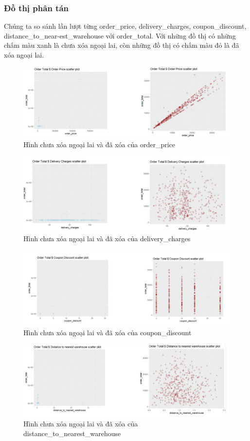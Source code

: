 \subsubsection{Đồ thị phân tán}
Chúng ta so sánh  lần lượt từng order\_price, delivery\_charges, coupon\_discount, distance\_to\_near-est\_warehouse với order\_total. Với những đồ thị có những chấm màu xanh là chưa xóa ngoại lai, còn những đồ thị có chấm màu đỏ là đã xóa ngoại lai.
\begin{figure}[!htbp]
    \centering
    \includegraphics[width=0.85\linewidth]{graphics/bang9.jpg}
    \caption{Hình chưa xóa ngoại lai và đã xóa của order\_price}
    \label{a}
\end{figure}
\begin{figure}[!htbp]
    \centering
    \includegraphics[width=0.8\linewidth]{graphics/bang10.jpg}
    \caption{Hình chưa xóa ngoại lai và đã xóa của delivery\_charges}
    \label{b}
\end{figure}
\begin{figure}[!htbp]
    \centering
    \includegraphics[width=0.8\linewidth]{graphics/bang11.jpg}
    \caption{Hình chưa xóa ngoại lai và đã xóa của coupon\_discount}
    \label{c}
\end{figure}
\begin{figure}[!htbp]
    \centering
    \includegraphics[width=0.8\linewidth]{graphics/bang12.jpg}
    \caption{Hình chưa xóa ngoại lai và đã xóa của distance\_to\_nearest\_warehouse}
    \label{d}
\end{figure}

